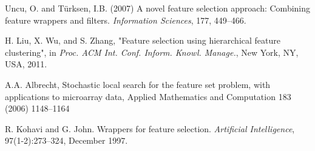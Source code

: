 \documentclass[a4paper,11pt]{article}
\begin{document}

\begin{thebibliography}{}

Uncu, O. and T\"urksen, I.B. (2007) A novel feature selection
approach: Combining feature wrappers and filters. \textit{Information Sciences}, 177, 449--466.

H. Liu, X. Wu, and S. Zhang, "Feature selection using hierarchical feature clustering", in \textit{Proc. ACM Int. Conf. Inform. Knowl. Manage.}, New York, NY, USA, 2011.

A.A. Albrecht, Stochastic local search for the feature set problem, with applications to microarray data, Applied Mathematics and Computation 183 (2006) 1148–1164

R. Kohavi and G. John. Wrappers for feature selection. \textit{Artificial Intelligence}, 97(1-2):273–324,
December 1997.

\end{thebibliography}
\end{document}
